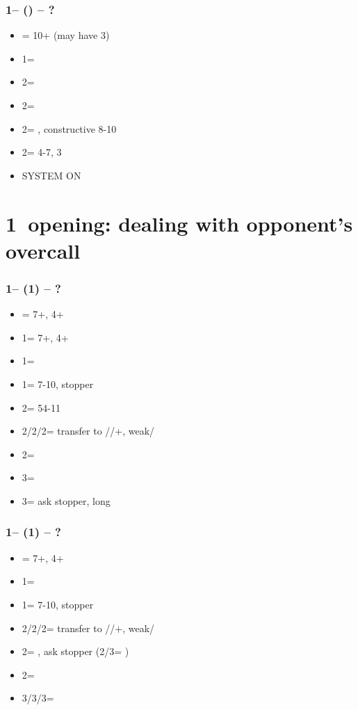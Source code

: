 \subsubsection*{1\spades -- (\dbl) -- ?}
\begin{itemize}
    \item \rdbl = 10+ (may have 3\spades)
    \item 1\nt = \trsf{2\clubs}
    \item 2\clubs = \trsf{2\diams}
    \item 2\diams = \trsf{2\hearts}
    \item 2\hearts = \trsf{2\spades}, constructive 8-10
    \item 2\spades = 4-7, 3\spades
    \item \small{SYSTEM ON}
\end{itemize}

\section{\texorpdfstring{1\clubs\ opening: dealing with opponent's overcall}{oppsOvercallTfx1c}}\label{sec:oppsOvercallTfx1c}

\subsubsection*{1\clubs -- (1\diams) -- ?}
\begin{itemize}
    \item \dbl = 7+, 4+\hearts
    \item 1\hearts = 7+, 4+\spades
    \item 1\spades = \nt
    \item 1\nt = 7-10, \diams stopper
    \item 2\clubs = 54-11
    \item 2\diams/2\hearts/2\spades = transfer to \hearts/\spades/+, weak/\gf
    \item 2\nt = \inv
    \item 3\clubs = \inv
    \item 3\diams = ask stopper, long \clubs
\end{itemize}

\subsubsection*{1\clubs -- (1\hearts) -- ?}
\begin{itemize}
    \item \dbl = 7+, 4+\spades
    \item 1\spades = \nt
    \item 1\nt = 7-10, \hearts stopper
    \item 2\clubs/2\hearts/2\spades = transfer to \diams/\spades/+, weak/\gf
    \item 2\diams = \invp, ask stopper (2\nt/3\clubs = \nf)
    \item 2\nt = \inv
    \item 3\clubs/3\diams/3\spades = \inv
\end{itemize}

